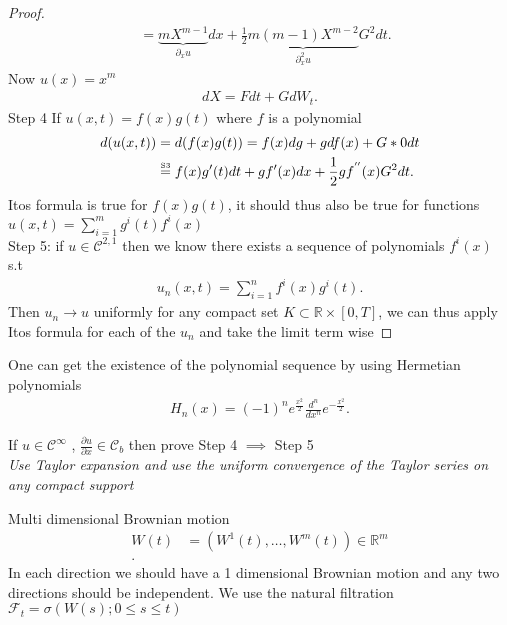 \begin{proof}
\begin{align*}
             &= \underbrace{mX^{m-1}}_{\partial_x u}dx + \frac{1}{2} \underbrace{m(m-1)X^{m-2}}_{\partial^2_x u} G^2dt  
 .\end{align*}
 Now $u(x) =x^{m}  $
 \begin{align*}
  dX  =F dt + G dW_t
 .\end{align*}
 Step 4  If $u(x,t) = f(x)g(t)$ where  $f$ is a polynomial
  \begin{align*}
    d(u(x,t)) &= d(f(x)g(t)) = f(x)dg + g df(x) + G*0 dt  \\
              &\myS{S3}{=} f(x)g'(t) dt + gf'(x) dx + \frac{1}{2}gf^{''}(x) G^2 dt 
  .\end{align*}
  Itos formula is true for $f(x)g(t)$, it should thus also be true for functions $u(x,t) = \sum_{i=1}^{m} g^{i}(t)f^{i}(x) $ \\[1ex]
  Step 5: if   $u \in \mathcal{C}^{2,1} $ then we know there exists a sequence of polynomials $f^{i}(x) $  s.t
  \begin{align*}
    u_n(x,t) = \sum_{i=1}^{n} f^{i}(x)g^{i}(t)
  .\end{align*}
  Then $u_n \to u$ uniformly for any compact set $K \subset  \mathbb{R} \times  [0,T] $, we can thus apply 
  Itos formula for each of the $u_n$ and take the limit term wise  
\end{proof}
\begin{remark}
 One can get the existence of the polynomial sequence by using Hermetian polynomials 
 \begin{align*}
  H_n(x) = (-1)^{n}  e^{\frac{x^2}{2}} \frac{d^{n}}{d x^{n} } e^{-\frac{x^2}{2}} 
 .\end{align*}
\end{remark}
\begin{exercise}
  If $u \in  \mathcal{C}^{\infty} $  , $\frac{\partial u}{\partial x} \in  \mathcal{C}_b$ then prove Step 4 $\implies$ Step 5 \\[1ex]
  \textit{Use Taylor expansion and use the uniform convergence of the Taylor series on any compact support }
\end{exercise}
\begin{remark}
 Multi dimensional  Brownian motion 
 \begin{align*}
  W(t) &= (W^{1}(t),\ldots ,W^{m}(t)  ) \in  \mathbb{R}^{m} \\
 .\end{align*}
 In each direction we should have a 1 dimensional Brownian motion and any two directions should be independent.
 We use the natural filtration $\mathcal{F}_t = \sigma(W(s) ; 0\le s\le t)$
\end{remark}
